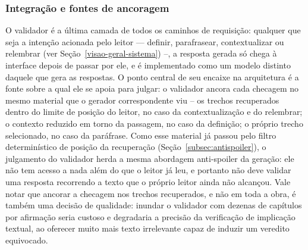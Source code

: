 \subsubsection*{Integração e fontes de ancoragem}
\label{subsubsec:arquitetura}

O validador é a última camada de todos os caminhos de requisição: qualquer que seja a intenção acionada pelo leitor --- definir, parafrasear, contextualizar ou relembrar (ver Seção~\ref{visao-geral-sistema}) --, a resposta gerada só chega à interface depois de passar por ele, e é implementado como um modelo distinto daquele que gera as respostas. O ponto central de seu encaixe na arquitetura é a fonte sobre a qual ele se apoia para julgar: o validador ancora cada checagem no mesmo material que o gerador correspondente viu -- os trechos recuperados dentro do limite de posição do leitor, no caso da contextualização e do relembrar; o contexto reduzido em torno da passagem, no caso da definição; o próprio trecho selecionado, no caso da paráfrase. Como esse material já passou pelo filtro determinístico de posição da recuperação (Seção~\ref{subsec:antispoiler}), o julgamento do validador herda a mesma abordagem anti-spoiler da geração: ele não tem acesso a nada além do que o leitor já leu, e portanto não deve validar uma resposta recorrendo a texto que o próprio leitor ainda não alcançou. Vale notar que ancorar a checagem nos trechos recuperados, e não em toda a obra, é também uma decisão de qualidade: inundar o validador com dezenas de capítulos por afirmação seria custoso e degradaria a precisão da verificação de implicação textual, ao oferecer muito mais texto irrelevante capaz de induzir um veredito equivocado.
 
